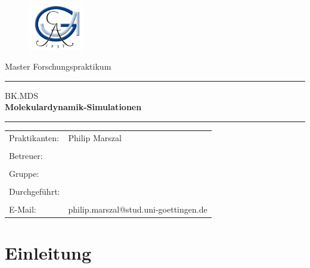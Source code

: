 \documentclass[a4paper, 12pt]{article}
\begin{document}
 \begin{titlepage}
 \begin{figure}[t]
 \includegraphics[height=2cm]{georg} \hfill
 \end{figure}

\normalsize
\vspace{1cm}

\begin{center}
\Large Master Forschungspraktikum \\ \vspace{1cm}
\hrule \vspace{3mm}
\large {BK.MDS} \\
\Huge{\bf Molekulardynamik-Simulationen}
\vspace{5mm}
\hrule
\end{center}

\normalsize

\begin{table}[!h]
\begin{center}

  \begin{tabular}{ll}
  Praktikanten: &Philip Marszal\\
   &\\
  Betreuer: & \\
  &\\
  Gruppe: &\\
  &\\
  Durchgeführt: &\\

\vspace{1cm}& \\
  E-Mail: & \ttfamily philip.marszal@stud.uni-goettingen.de\\
\end{tabular}
\end{center}
\end{table}
\vspace{2cm}


\end{titlepage}

\thispagestyle{empty}
\newpage
\thispagestyle{empty}
\mbox{}
\newpage
\thispagestyle{empty}
\tableofcontents
\newpage

\pagestyle{fancy}
\setcounter{page}{1}

\section{Einleitung}
\end{document}
